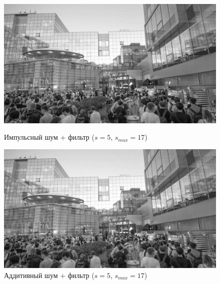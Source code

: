 \documentclass[a4paper]{article}
\begin{document}
\begin{figure}[H]
    \begin{minipage}{0.49\textwidth}
        \centering \includegraphics[width=\textwidth]{images/3_nonlinear_filters/impulse - adaptive median (s_start=5, s_max=17).jpg}
        \caption{Импульсный шум + фильтр ($s = 5$, $s_{max}=17$)}
    \end{minipage}\hfill
    \begin{minipage}{0.49\textwidth}
        \centering \includegraphics[width=\textwidth]{images/3_nonlinear_filters/additive - adaptive median (s_start=5, s_max=17).jpg}
        \caption{Аддитивный шум + фильтр ($s = 5$, $s_{max}=17$)}
    \end{minipage}
\end{figure}
\end{document}
